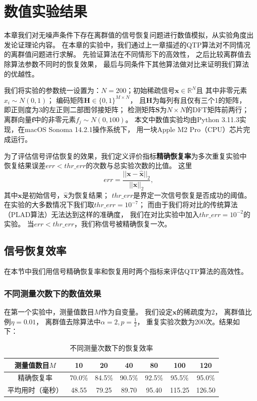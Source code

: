 \documentclass[AutoFakeBold]{LZUThesis}
\begin{document}
\chapter{数值实验结果}
\label{result}

本章我们对无噪声条件下存在离群值的信号恢复问题进行数值模拟，从实验角度出发论证理论内容。
在本章的实验中，我们通过上一章描述的QTP算法对不同情况的离群值问题进行求解。
先验证算法在不同情形下的高效性，
之后比较离群值去除算法参数不同时的恢复效果，
最后与同条件下其他算法做对比来证明我们算法的优越性。

我们将实验的参数统一设置为：$N = 200$；初始稀疏信号$\mathbf{x} \in \mathbb{R}^N$且
其中非零元素$x_i \sim N(0,1)$；
编码矩阵$\mathbf{H} \in \{0, 1\}^{M \times N}$，
且$\mathbf{H}$为每列有且仅有三个1的矩阵，
即正则度为3的左正则二部图邻接矩阵；
检测矩阵$\mathbf{S}$为$N \times N$的DFT矩阵前两行；
离群向量$\mathbf{f}$中的非零元素$f_j \sim N(0,100)$。
本文中数值实验均由Python 3.11.3实现，在macOS Sonoma 14.2.1操作系统下，
用一块Apple M2 Pro（CPU）芯片完成运行。

为了评估信号评估恢复的效果，我们定义评价指标\textbf{精确恢复率}为多次重复实验中
恢复结果误差$err < thr\_err$的次数与总实验次数的比值。
这里
\begin{equation}
    err = \frac{||{\mathbf{x} - \hat{\mathbf{x}}}||_2}{||\mathbf{x}||_2}, 
\end{equation}
其中$\mathbf{x}$是初始信号，$\hat{\mathbf{x}}$为恢复结果；
$thr\_err$是界定一次信号恢复是否成功的阈值。
在实验的大多数情况下我们取$thr\_err = 10^{-7}$；
而由于我们将对比的传统算法（PLAD算法）无法达到这样的准确度，
我们在对比实验中加入$thr\_err = 10^{-2}$的实验。
当$err < thr\_err$，我们称信号被精确恢复一次。

\section{信号恢复效率}

在本节中我们用信号精确恢复率和恢复用时两个指标来评估QTP算法的高效性。

\subsection{不同测量次数下的数值效果}

在第一个实验中，测量值数目$M$作为自变量。
我们设定$\mathbf{x}$的稀疏度为2，
离群值比例$\eta=0.01$，
离群值去除算法中$\alpha = 2, p = \frac{1}{2}$，
重复实验次数为200次。结果如下：

\begin{table}[H]
    \centering
    \caption{不同测量次数下的恢复效率}
    \begin{tabular}{ccccccc} %
        \toprule
        测量值数目$M$ & 10  & 20  & 40  & 80 & 100 & 120 \\
        \toprule
        精确恢复率 & 70.0\% & 84.5\% & 90.5\%  & 92.5\% & 95.5\% & 95.0\% \\
        \midrule
        平均用时（毫秒） & 48.55 & 79.25 & 89.70 & 95.40 & 115.25 & 126.50 \\
        \bottomrule
    \end{tabular}
    \label{effeciency}
\end{table}
\end{document}
